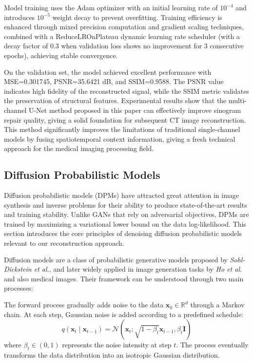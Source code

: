 \documentclass[
reprint,
superscriptaddress,
nofootinbib,
amsmath,amssymb,
aps,
prd,
]{revtex4-2}
\begin{document}
Model training uses the Adam optimizer with an initial learning rate of $10^{-4}$ and introduces $10^{-5}$ weight decay to prevent overfitting. 
Training efficiency is enhanced through mixed precision computation and gradient scaling techniques, combined with a ReduceLROnPlateau dynamic learning rate scheduler (with a decay factor of 0.3 when validation loss shows no improvement for 3 consecutive epochs), achieving stable convergence.


On the validation set, the model achieved excellent performance with MSE=0.301745, PSNR=35.6421 dB, and SSIM=0.9588. The PSNR value indicates high fidelity of the reconstructed signal, while the SSIM metric validates the preservation of structural features. Experimental results show that the multi-channel U-Net method proposed in this paper can effectively improve sinogram repair quality, giving a solid foundation for subsequent CT image reconstruction. This method significantly improves the limitations of traditional single-channel models by fusing spatiotemporal context information, giving a fresh technical approach for the medical imaging processing field.


\subsection{Diffusion Probabilistic Models}
Diffusion probabilistic models (DPMs) have attracted great attention in image synthesis and inverse problems for their ability to produce state-of-the-art results and training stability. Unlike GANs that rely on adversarial objectives, DPMs are trained by maximizing a variational lower bound on the data log-likelihood. This section introduces the core principles of denoising diffusion probabilistic models relevant to our reconstruction approach.

Diffusion models are a class of probabilistic generative models proposed by \textit{Sohl-Dickstein et al.}\cite{pmlr-v37-sohl-dickstein15}, and later widely applied in image generation tasks by \textit{Ho et al.}\cite{ho2020denoisingdiffusionprobabilisticmodels} and also medical images. Their framework can be understood through two main processes:

The forward process gradually adds noise to the data $\mathbf{x}_0 \in \mathbb{R}^d$ through a Markov chain. At each step, Gaussian noise is added according to a predefined schedule:
\begin{equation}
    q(\mathbf{x}_t \mid \mathbf{x}_{t-1}) = \mathcal{N}(\mathbf{x}_t; \sqrt{1 - \beta_t} \mathbf{x}_{t-1}, \beta_t \mathbf{I})
\end{equation}
where $\beta_t \in (0, 1)$ represents the noise intensity at step $t$. The process eventually transforms the data distribution into an isotropic Gaussian distribution.
\end{document}
